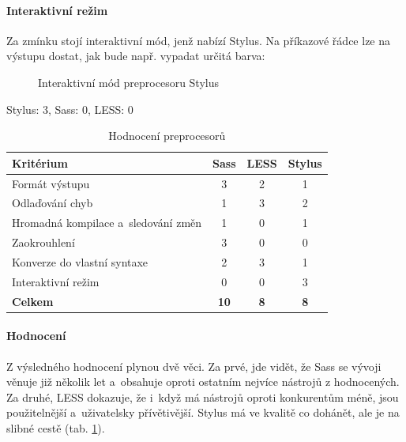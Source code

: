 \documentclass[thesis=B,czech]{FITthesis}[2012/06/26]
\begin{document}
\paragraph{Interaktivní režim}

 Za zmínku stojí interaktivní mód, jenž nabízí Stylus. Na příkazové řádce lze na výstupu dostat, jak bude např. vypadat určitá barva:
\begin{figure}[h]
	\begin{center}
	\end{center}
	\caption{Interaktivní mód preprocesoru Stylus}
	\label{imgStyl2}
\end{figure}

Stylus: 3, \gls{Sass}: 0, LESS: 0



\begin{table}\centering
 	\caption[Hodnocení preprocesorů]{Hodnocení preprocesorů}\label{tab:pre}
 	\begin{tabular}{|l|c|c|c|}\hline
	\textbf{Kritérium} & \textbf{Sass} & \textbf{LESS} & \textbf{Stylus} \tabularnewline	
 	\hline\hline
		 Formát výstupu & 3 & 2 & 1\tabularnewline\hline
		 Odlaďování chyb & 1 & 3 & 2\tabularnewline\hline
		 Hromadná kompilace a~sledování změn & 1 & 0 & 1\tabularnewline\hline
		 Zaokrouhlení & 3 & 0 & 0\tabularnewline\hline
		 Konverze do vlastní syntaxe & 2 & 3 & 1\tabularnewline\hline
		 Interaktivní režim  & 0 & 0 & 3\tabularnewline\hline
		 \textbf{Celkem} & \textbf{10} & \textbf{8} & \textbf{8}\tabularnewline\hline
 	\end{tabular}
\end{table} 


\paragraph{Hodnocení}

Z výsledného hodnocení plynou dvě věci. Za prvé, jde vidět, že \gls{Sass} se vývoji věnuje již několik let a~obsahuje oproti ostatním nejvíce nástrojů z hodnocených. Za druhé, LESS dokazuje, že i~když má nástrojů oproti konkurentům méně, jsou použitelnější a~uživatelsky přívětivější. Stylus má ve kvalitě co dohánět, ale je na slibné cestě (tab. \ref{tab:pre}).
\end{document}
